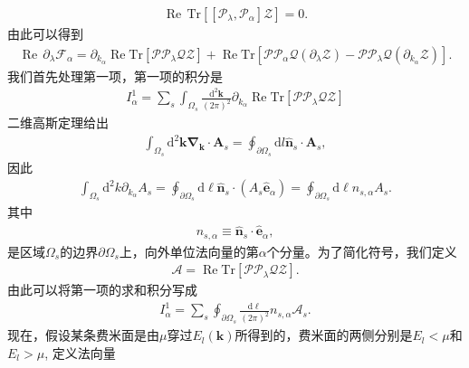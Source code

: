 \documentclass[10pt, oneside]{article}
\begin{document}
\begin{align}
	\operatorname{Re} \, \mathrm{Tr} \left[ \left[\mathcal{P}_{\lambda}, \mathcal{P}_{\alpha}\right]  \mathcal{Z} \right] = 0.
\end{align}
由此可以得到 
\begin{align}
	\boxed{
		\operatorname{Re} \, \partial_{\lambda} \mathcal{F}_{\alpha} = \partial_{k_{\alpha}} \operatorname{Re} \mathrm{Tr} \left[\mathcal{P} \mathcal{P}_{\lambda} \mathcal{Q} \mathcal{Z} \right] + \operatorname{Re} \mathrm{Tr} \left[\mathcal{P} \mathcal{P}_{\alpha} \mathcal{Q} \left(\partial_{\lambda} \mathcal{Z}\right) - \mathcal{P} \mathcal{P}_{\lambda} \mathcal{Q} \left(\partial_{k_{\alpha}} \mathcal{Z}\right) \right].
	}
\end{align}
我们首先处理第一项，第一项的积分是
\begin{align}
	I^{1}_{\alpha}  = \sum_{s} \int_{\Omega_{s }} \frac{\mathrm{d}^{2} \bm{k}}{\left(2 \pi\right)^2}  \partial_{k_{\alpha}} \operatorname{Re} \mathrm{Tr} \left[\mathcal{P} \mathcal{P}_{\lambda} \mathcal{Q} \mathcal{Z} \right] 
\end{align}
二维高斯定理给出
\begin{align}
	\int_{\Omega_{s}} \mathrm{d}^{2} \bm{k}	\bm{\nabla}_{\bm{k}} \cdot \bm{A}_{s} = \oint_{\partial \Omega_{s}} \mathrm{d} l \hat{\bm{n}}_{s} \cdot \bm{A}_{s},
\end{align}
因此
\begin{align}
	\int_{\Omega_{s}} \mathrm{d}^{2} k \partial_{k_{\alpha}} A_{s } = \oint_{\partial \Omega_{s}} \mathrm{d} \ell \hat{\bm{n}}_{s} \cdot \left(A_{s } \hat{\bm{e}}_{\alpha}\right) =  \oint_{\partial \Omega_{s}} \mathrm{d} \ell n_{s, \alpha} A_{s}.
\end{align}
其中
\begin{align}
	n_{s,\alpha} \equiv \hat{\bm{n }}_{s } \cdot \hat{\bm{e}}_{\alpha},
\end{align}
是区域\(\Omega_{s }\)的边界\(\partial \Omega_{s}\)上，向外单位法向量的第\(\alpha\)个分量。为了简化符号，我们定义
\begin{align}
	\mathcal{A} = \operatorname{Re} \mathrm{Tr} \left[\mathcal{P} \mathcal{P}_{\lambda} \mathcal{Q} \mathcal{Z} \right] .
\end{align}
由此可以将第一项的求和积分写成
\begin{align}
	I^{1}_{\alpha}  = \sum_{s } \oint_{\partial \Omega_{s }} \frac{\mathrm{d} \ell }{\left(2 \pi\right)^2} n_{s,\alpha} \mathcal{A}_{s}.
\end{align}
现在，假设某条费米面是由\(\mu\)穿过\(E_{l} \left(\bm{k}\right)\)所得到的，费米面的两侧分别是\(E_{l} < \mu\)和\(E_{l} > \mu\), 定义法向量
\end{document}
